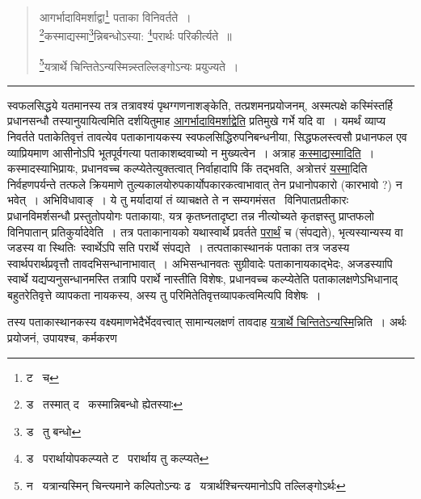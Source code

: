 \documentclass[11pt, openany]{book}
\begin{document}
\begin{quote}
{\na आगर्भादाविमर्शाद्वा\renewcommand{\thefootnote}{1}\footnote{ट \textendash\ च} पताका विनिवर्तते~।\\
\renewcommand{\thefootnote}{2}\footnote{ड \textendash\ तस्मात् द \textendash\ कस्मान्निबन्धो ह्येतस्याः}कस्माद्यस्मा\renewcommand{\thefootnote}{3}\footnote{ड \textendash\ तु बन्धो}न्निबन्धोऽस्या: \renewcommand{\thefootnote}{4}\footnote{ड \textendash\ परार्थायोपकल्प्यते ट \textendash\ परार्थाय तु कल्प्यते}परार्थः परिकीर्त्यते~॥

\renewcommand{\thefootnote}{5}\footnote{न \textendash\ यत्रान्यस्मिन् चिन्त्यमाने कल्पितोऽन्यः ढ \textendash\ यत्रार्थश्चिन्त्यमानोऽपि तल्लिङ्गोऽर्थः}यत्रार्थे चिन्तितेऽन्यस्मिन्न्स्तल्लिङ्गोऽन्यः प्रयुज्यते~।}
\end{quote}

\hrule

\vspace{2mm}
स्वफलसिद्धये यतमानस्य तत्र तत्रावश्यं पृथग्गणनाशङ्केति, तत्प्रशमनप्रयोजनम्, अस्मत्पक्षे कस्मिंस्तर्हि प्रधानसन्धौ तस्यानुयायित्वमिति दर्शयितुमाह \underline{आगर्भादाविमर्शाद्वेति} प्रतिमुखे गर्भे यदि वा~। यमर्थं व्याप्य निवर्तते पताकेतिवृत्तं तावत्येव पताकानायकस्य स्वफलसिद्धिरुपनिबन्धनीया, सिद्धफलस्त्वसौ प्रधानफल एव व्याप्रियमाण आसीनोऽपि भूतपूर्वगत्या पताकाशब्दवाच्यो न मुख्यत्वेन~। अत्राह \underline{कस्माद्यस्मादिति}~। कस्मादस्याभिप्रायः, प्रधानवच्च कल्प्येतेत्युक्तत्वात् निर्वाहादापि किं तद्भवति, अत्रोत्तरं \underline{यस्मा}दिति निर्वहणपर्यन्ते तत्फले क्रियमाणे तुल्यकालयोरुपकार्योपकारकत्वाभावात् तेन प्रधानोपकारो (कारभावो ?) न भवेत्~। अभिविधावाङ्~। ये तु मर्यादायां तं व्याचक्षते ते न सम्यगमंसत \textendash\ विनिपातप्रतीकारः प्रधानविमर्शसन्धौ प्रस्तुतोपयोगः पताकायाः, यत्र कृतघ्नतादृष्टा तन्न नीत्योच्यते कृतज्ञस्तु प्राप्तफलो विनिपातान् प्रतिकुर्यादेवेति~। तत्र पताकानायको यथास्वार्थे प्रवर्तते \underline{परार्थं} च (संपद्यते), भृत्यस्यान्यस्य वा जडस्य वा स्थितिः\textendash\ स्वार्थेऽपि सति परार्थे संपद्यते~। तत्पताकास्थानकं पताका तत्र जडस्य स्वार्थपरार्थप्रवृत्तौ तावदभिसन्धानाभावात्~। अभिसन्धानवतः सुग्रीवादेः पताकानायकाद्भेदः, अजडस्यापि स्वार्थे यद्यप्यनुसन्धानमस्ति तत्रापि परार्थे नास्तीति विशेषः, प्रधानवच्च कल्प्येतेति पताकालक्षणेऽभिधानाद् बहुतरेतिवृत्ते व्यापकता नायकस्य, अस्य तु परिमितेतिवृत्तव्यापकत्वमित्यपि विशेषः~।\\

\begin{sloppypar}
तस्य पताकास्थानकस्य वक्ष्यमाणभेदैर्भेदवत्त्वात् सामान्यलक्षणं तावदाह \underline{यत्रार्थे चिन्तितेऽन्यस्मि}न्निति~। अर्थः प्रयोजनं, उपायश्च, कर्मकरण \textendash
\end{sloppypar}
\end{document}
